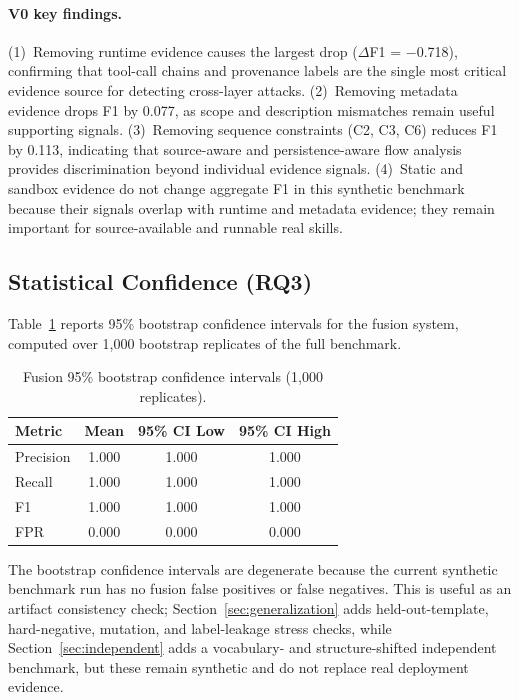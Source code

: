 \documentclass[10pt]{article}
\begin{document}
\paragraph{V0 key findings.}
(1)~Removing runtime evidence causes the largest drop ($\Delta$F1 = $-$0.718), confirming that tool-call chains and provenance labels are the single most critical evidence source for detecting cross-layer attacks.
(2)~Removing metadata evidence drops F1 by 0.077, as scope and description mismatches remain useful supporting signals.
(3)~Removing sequence constraints (C2, C3, C6) reduces F1 by 0.113, indicating that source-aware and persistence-aware flow analysis provides discrimination beyond individual evidence signals.
(4)~Static and sandbox evidence do not change aggregate F1 in this synthetic benchmark because their signals overlap with runtime and metadata evidence; they remain important for source-available and runnable real skills.

\subsection{Statistical Confidence (RQ3)}

Table~\ref{tab:bootstrap} reports 95\% bootstrap confidence intervals for the fusion system, computed over 1{,}000 bootstrap replicates of the full benchmark.

\begin{table}[t]
\centering
\caption{Fusion 95\% bootstrap confidence intervals (1{,}000 replicates).}
\label{tab:bootstrap}
\begin{tabular}{lccc}
\toprule
Metric & Mean & 95\% CI Low & 95\% CI High \\
\midrule
Precision & 1.000 & 1.000 & 1.000 \\
Recall & 1.000 & 1.000 & 1.000 \\
F1 & 1.000 & 1.000 & 1.000 \\
FPR & 0.000 & 0.000 & 0.000 \\
\bottomrule
\end{tabular}
\end{table}

The bootstrap confidence intervals are degenerate because the current synthetic benchmark run has no fusion false positives or false negatives. This is useful as an artifact consistency check; Section~\ref{sec:generalization} adds held-out-template, hard-negative, mutation, and label-leakage stress checks, while Section~\ref{sec:independent} adds a vocabulary- and structure-shifted independent benchmark, but these remain synthetic and do not replace real deployment evidence.
\end{document}
